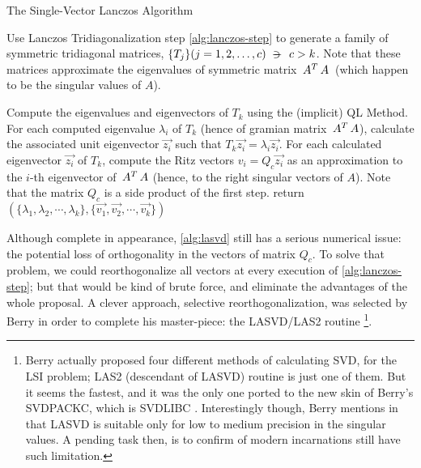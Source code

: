 \begin{algorithm}
  \label{alg:lasvd}
  \caption{The Single-Vector Lanczos Algorithm}
%
  \DontPrintSemicolon
%
    \BlankLine
%
    \BlankLine
    \BlankLine
%
    Use Lanczos Tridiagonalization step \cref{alg:lanczos-step} to
    generate a family of symmetric tridiagonal matrices, $\{ T_j \} (j
    = 1,2, \dots, c) \suchthat c > k$. Note that these matrices
    approximate the eigenvalues of symmetric matrix
    $\,{A}^{T}\,A$\ (which happen to be the singular values of $A$). \;
    \BlankLine
    \BlankLine
%
    \strut Compute the eigenvalues and eigenvectors of $T_k$ using the
    (implicit) QL Method. \;
    \BlankLine
    \BlankLine
%   
    For each computed eigenvalue $\lambda_i$ of $T_k$ (hence of gramian matrix
    $\,{A}^{T}\,A$), calculate the associated unit eigenvector $\vec{z_i}$
    such that $T_k\vec{z_i} = \lambda_i\vec{z_i}$. \;
    \BlankLine
    \BlankLine
% 
    For each calculated eigenvector $\vec{z_i}$ of $T_k$, compute the Ritz
    vectors $v_i = Q_c\vec{z_i}$ as an approximation to the
    $i$-th eigenvector of $\,{A}^{T}\,A$ (hence, to the right singular
    vectors of $A$). Note that the matrix $Q_c$ is a side product of
    the first step. \; 
    \BlankLine
    \BlankLine
%
    return $(\{\lambda_1,\lambda_2,\cdots,\lambda_k\},
            \{\vec{v_1},\vec{v_2},\cdots,\vec{v_k}\})$
\end{algorithm}
\hfill

Although complete in appearance, \cref{alg:lasvd} still has a serious
numerical issue: the potential loss of orthogonality in the vectors of
matrix $Q_c$. To solve that problem, we could reorthogonalize all
vectors at every execution of \cref{alg:lanczos-step}; but that would
be kind of brute force, and eliminate the advantages of the whole
proposal. A clever approach, selective reorthogonalization, was
selected by Berry in order to complete his master-piece: the LASVD/LAS2
routine \footnote{Berry actually proposed four different methods of
  calculating SVD, for the LSI problem; LAS2 (descendant of LASVD)
  routine is just one of them. But it seems the fastest, and it was the
  only one ported to the new skin of Berry's SVDPACKC,
  which is SVDLIBC \cite{svdlibc}. Interestingly though, Berry
  mentions in \cite{berry91} that LASVD is suitable only for low to
  medium precision in the singular values. A pending task then, is to
  confirm of modern incarnations still have such limitation.}. \\

